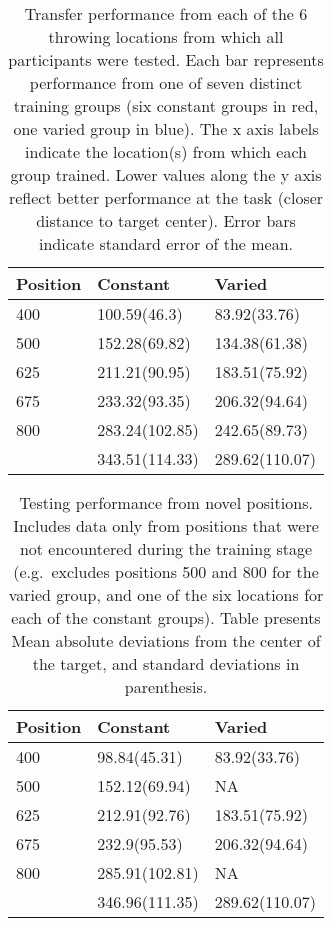 \documentclass[
  jou, donotrepeattitle,floatsintext]{article}
\begin{document}
\begin{table}

\caption{\label{tab:e2table1}Transfer performance from each of the 6 throwing locations from which all participants were tested. Each bar represents performance from one of seven distinct training groups (six constant groups in red, one varied group in blue). The x axis labels indicate the location(s) from which each group trained. Lower values along the y axis reflect better performance at the task (closer distance to target center). Error bars indicate standard error of the mean.}
\begin{tabular}[t]{lll}
\toprule
Position & Constant & Varied\\
\midrule
400 & 100.59(46.3) & 83.92(33.76)\\
500 & 152.28(69.82) & 134.38(61.38)\\
625 & 211.21(90.95) & 183.51(75.92)\\
675 & 233.32(93.35) & 206.32(94.64)\\
800 & 283.24(102.85) & 242.65(89.73)\\
\addlinespace
900 & 343.51(114.33) & 289.62(110.07)\\
\bottomrule
\end{tabular}
\end{table}



\begin{table}

\caption{\label{tab:e2table3}Testing performance from novel positions. Includes data only from positions that were not encountered during the training stage (e.g.~excludes positions 500 and 800 for the varied group, and one of the six locations for each of the constant groups). Table presents Mean absolute deviations from the center of the target, and standard deviations in parenthesis.}
\begin{tabular}[t]{lll}
\toprule
Position & Constant & Varied\\
\midrule
400 & 98.84(45.31) & 83.92(33.76)\\
500 & 152.12(69.94) & NA\\
625 & 212.91(92.76) & 183.51(75.92)\\
675 & 232.9(95.53) & 206.32(94.64)\\
800 & 285.91(102.81) & NA\\
\addlinespace
900 & 346.96(111.35) & 289.62(110.07)\\
\bottomrule
\end{tabular}
\end{table}
\end{document}
